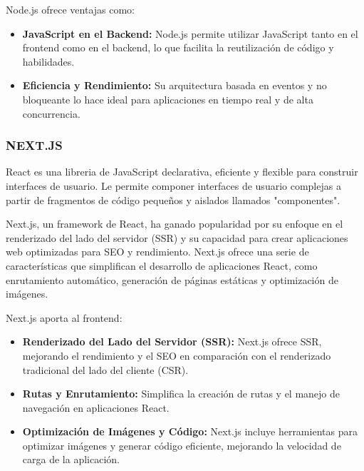 Node.js ofrece ventajas como:
\begin{itemize}
    \item \textbf{JavaScript en el Backend:} Node.js permite utilizar JavaScript tanto en el frontend como en el backend, lo que facilita la reutilización de código y habilidades.
    \item \textbf{Eficiencia y Rendimiento:} Su arquitectura basada en eventos y no bloqueante lo hace ideal para aplicaciones en tiempo real y de alta concurrencia.
\end{itemize}

\subsubsection{NEXT.JS}
React es una libreria de JavaScript declarativa, eficiente y flexible para construir interfaces de usuario. Le permite componer interfaces de usuario complejas a partir de fragmentos de código pequeños y aislados llamados "componentes".

Next.js, un framework de React, ha ganado popularidad por su enfoque en el renderizado del lado del servidor (SSR) y su capacidad para crear aplicaciones web optimizadas para SEO y rendimiento. Next.js ofrece una serie de características que simplifican el desarrollo de aplicaciones React, como enrutamiento automático, generación de páginas estáticas y optimización de imágenes. \citep{vercel2023next}

Next.js aporta al frontend:
\begin{itemize}
    \item \textbf{Renderizado del Lado del Servidor (SSR):} Next.js ofrece SSR, mejorando el rendimiento y el SEO en comparación con el renderizado tradicional del lado del cliente (CSR).
    \item \textbf{Rutas y Enrutamiento:} Simplifica la creación de rutas y el manejo de navegación en aplicaciones React.
    \item \textbf{Optimización de Imágenes y Código:} Next.js incluye herramientas para optimizar imágenes y generar código eficiente, mejorando la velocidad de carga de la aplicación.
\end{itemize}